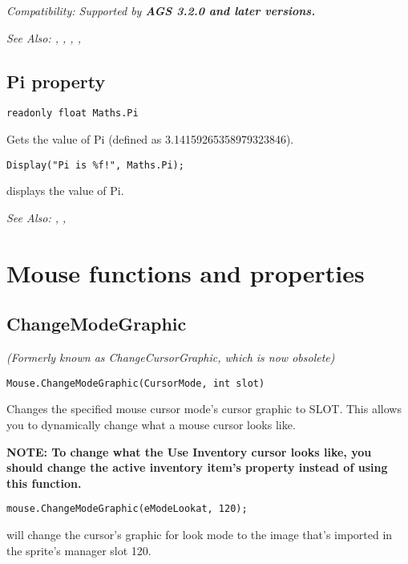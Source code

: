 \it{Compatibility:} Supported by \bf{AGS 3.2.0} and later versions.

\it{See Also:} ,
,
,
, 


\subsection{Pi property}\label{Maths.Pi}%

\begin{verbatim}
readonly float Maths.Pi
\end{verbatim}
Gets the value of Pi (defined as 3.14159265358979323846).

\begin{verbatim}
Display("Pi is %f!", Maths.Pi);
\end{verbatim}
displays the value of Pi.

\it{See Also:} , ,



\section{Mouse functions and properties}%


\subsection{ChangeModeGraphic}\label{Mouse.ChangeModeGraphic}%

\it{(Formerly known as ChangeCursorGraphic, which is now obsolete)}

\begin{verbatim}
Mouse.ChangeModeGraphic(CursorMode, int slot)
\end{verbatim}
Changes the specified mouse cursor mode's cursor graphic to SLOT.
This allows you to dynamically change what a mouse cursor looks like.

\bf{NOTE:} To change what the Use Inventory cursor looks like, you should change
the active inventory item's  property
instead of using this function.

\begin{verbatim}
mouse.ChangeModeGraphic(eModeLookat, 120);
\end{verbatim}
will change the cursor's graphic for look mode to the image that's imported in the sprite's manager slot 120.

